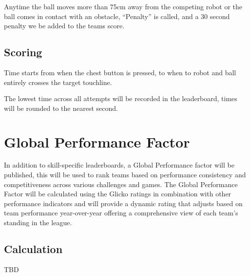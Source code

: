 Anytime the ball moves more than 75cm away from the competing robot or the ball comes in contact with
an obstacle,  ``Penalty'' is called, and a 30 second penalty we be added to the teams score.

\subsection{Scoring}
Time starts from when the chest button is pressed, to when to robot and ball entirely crosses the target touchline.

The lowest time across all attempts will be recorded in the leaderboard, times will be rounded to the nearest second.

\section{Global Performance Factor}
In addition to skill-specific leaderboards, a Global Performance factor will be published,
this will be used to rank teams based on performance consistency and competitiveness across
various challenges and games. The Global Performance Factor will be calculated using the 
Glicko ratings in combination with other performance indicators and  will provide a dynamic
rating that adjusts based on team performance year-over-year
offering a comprehensive view of each team's standing in the league.

\subsection{Calculation}
TBD
